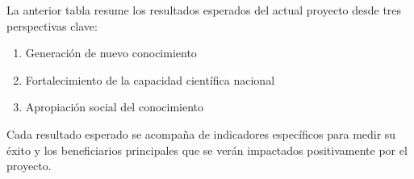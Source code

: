 



La anterior tabla resume los resultados esperados del actual proyecto desde tres perspectivas clave:

\begin{enumerate}
    \item Generación de nuevo conocimiento
    \item Fortalecimiento de la capacidad científica nacional
    \item Apropiación social del conocimiento
\end{enumerate}

Cada resultado esperado se acompaña de indicadores específicos para medir su éxito y los beneficiarios principales que se verán impactados positivamente por el proyecto.





